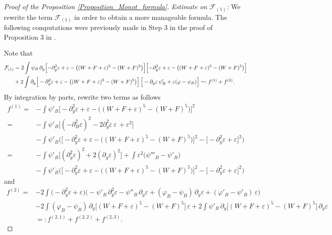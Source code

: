 \documentclass[16pt,english, oneside,reqno]{smfart}
\newcommand{\vare}{{\varepsilon}}
\newcommand{\vphi}{{\varphi}}
\begin{document}
\begin{proof}[Proof of the Proposition \ref{Proposition_Monot_formula}]
\textit{Estimate on $\mathcal{F}_{(1)}$:} 
We rewrite the term $\mathcal{F}_{(1)}$ in order to obtain a more manageable formula.
The following computations were previously made in Step 3 in the proof of Proposition 3 in \cite{MMPI}.

\vspace{0.4cm}
Note that
\begin{equation}
    \begin{split}
        \mathcal{F}_{(1)} 
        & = 2 \int \psi_B \,\partial_y\Bigl[- \partial^2_y \vare + \vare  - \bigl( (W+F+\vare)^5 - (W+F)^5 \bigr)  \Bigr]\Bigl[ - \partial^2_y \vare + \vare - \bigl( (W+F+\vare)^5 - (W+F)^5 \bigr)  \Bigr]\\
        & + 2 \int \partial_y \Big[ -\partial^2_y \vare+ \vare - \big( (W+F+\vare)^5 - (W+F)^5 \big) \Big]\,\Big[ -\partial_y \vare\, \psi'_B + \vare(\vphi -\psi_B) \Big] =: f^{(1)} + f^{(2)}.
    \end{split}
\end{equation}
By integration by parts, rewrite two terms as follows
\begin{equation}
\begin{split}
    f^{(1)} 
    = &- \int \psi'_B\Big[ - \partial^2_y \vare + \vare - \big( (W+F+\vare)^5 - (W+F)^5\big) \Big]^2\\
    = &-\int \psi'_B \Big[ (-\partial^2_B \vare)^2 - 2 \partial^2_y \vare \, \vare \, + \vare^2 \Big]  \\
    &- \int \psi'_B \Big(\big[ - \partial^2_y \vare + \vare - \big((W+F+\vare)^5 - (W+F)^5 \big)  \big]^2 - \big[ -\partial^2_y \vare + \vare \big]^2 \Big)\\
    = & - \int \psi'_B \Big[ (\partial^2_y \vare)^2 + 2 (\partial_y \vare)^2 \Big] + \int \vare^2 \big( \psi'''_B - \psi'_B \big)\\
    & - \int \psi'_B \Big(\big[ - \partial^2_y \vare + \vare - \big((W+F+\vare)^5 - (W+F)^5 \big)  \big]^2 - \big[ -\partial^2_y \vare + \vare \big]^2 \Big)
\end{split}
\end{equation}
and 
\begin{equation}
    \begin{split}
        f^{(2)} = 
        & -2 \int  \big( - \partial_y^2 \vare + \vare  \big)\big( -\psi'_B \, \partial_y^2\vare - \psi''_B\, \partial_y \vare + (\vphi_B - \psi_B)\, \partial_y \vare + (\vphi'_B - \psi'_B)\,\vare  \big)\\
        & -2 \int (\vphi_B - \psi_B)\, \partial_y \big[ (W+F+\vare)^5 - (W+F)^5 \big]\, \vare  +2\int  \psi'
        _B\, \partial_y \big[ (W+F+\vare)^5 - (W+F)^5 \big]\,\partial_y \vare\\
        & =: f^{(2,1)} + f^{(2,2)} + f^{(2,3)}.
    \end{split}
\end{equation}



\end{proof}
\end{document}
